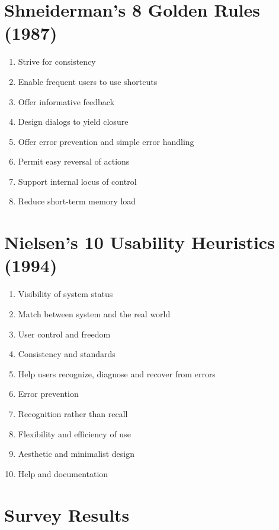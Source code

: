 \documentclass[a4paper,11pt,oneside]{article}
\begin{document}
\section{Shneiderman’s 8 Golden Rules (1987)}
\label{sec:s_rules}
\begin{enumerate}
\item Strive for consistency
\item Enable frequent users to use shortcuts
\item Offer informative feedback
\item Design dialogs to yield closure
\item Offer error prevention and simple error handling
\item Permit easy reversal of actions
\item Support internal locus of control
\item Reduce short-term memory load 
\end{enumerate}

\section{Nielsen’s 10 Usability Heuristics (1994)}
\label{sec:n_rules}
\begin{enumerate}
\item Visibility of system status
\item Match between system and the real world
\item User control and freedom
\item Consistency and standards
\item Help users recognize, diagnose and recover from errors
\item Error prevention
\item Recognition rather than recall
\item Flexibility and efficiency of use
\item Aesthetic and minimalist design
\item Help and documentation
\end{enumerate}

\section{Survey Results}
\label{sec:survey}
\end{document}
